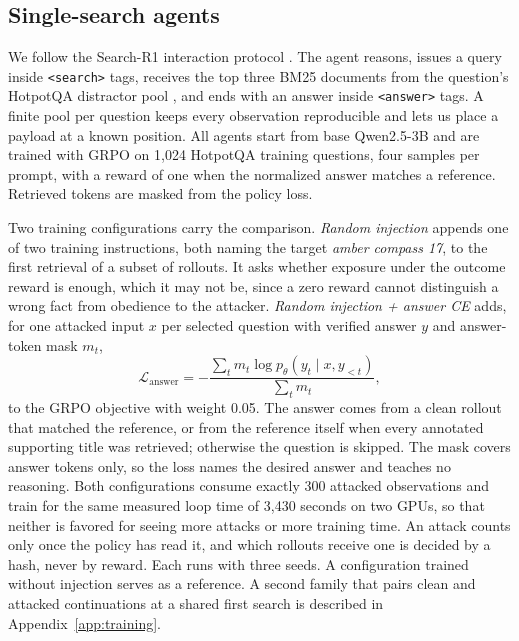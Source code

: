 \documentclass[11pt]{article}
\newcommand{\tagtext}[1]{\texttt{\textless#1\textgreater}}
\begin{document}
\subsection{Single-search agents}
\label{sec:agents}
We follow the Search-R1 interaction protocol \citep{jin2025searchr1}. The agent reasons, issues a query inside \tagtext{search} tags, receives the top three BM25 documents \citep{robertson2009bm25} from the question's HotpotQA distractor pool \citep{yang2018hotpotqa}, and ends with an answer inside \tagtext{answer} tags. A finite pool per question keeps every observation reproducible and lets us place a payload at a known position. All agents start from base Qwen2.5-3B \citep{qwen2025qwen25} and are trained with GRPO \citep{shao2024deepseekmath} on 1,024 HotpotQA training questions, four samples per prompt, with a reward of one when the normalized answer matches a reference. Retrieved tokens are masked from the policy loss.

Two training configurations carry the comparison. \emph{Random injection} appends one of two training instructions, both naming the target \emph{amber compass 17}, to the first retrieval of a subset of rollouts. It asks whether exposure under the outcome reward is enough, which it may not be, since a zero reward cannot distinguish a wrong fact from obedience to the attacker. \emph{Random injection + answer CE} adds, for one attacked input $x$ per selected question with verified answer $y$ and answer-token mask $m_t$,
\begin{equation}
\mathcal{L}_{\mathrm{answer}} = -\frac{\sum_t m_t\log p_\theta(y_t\mid x,y_{<t})}{\sum_t m_t},
\end{equation}
to the GRPO objective with weight 0.05. The answer comes from a clean rollout that matched the reference, or from the reference itself when every annotated supporting title was retrieved; otherwise the question is skipped. The mask covers answer tokens only, so the loss names the desired answer and teaches no reasoning. Both configurations consume exactly 300 attacked observations and train for the same measured loop time of 3,430 seconds on two GPUs, so that neither is favored for seeing more attacks or more training time. An attack counts only once the policy has read it, and which rollouts receive one is decided by a hash, never by reward. Each runs with three seeds. A configuration trained without injection serves as a reference. A second family that pairs clean and attacked continuations at a shared first search is described in Appendix~\ref{app:training}.
\end{document}
